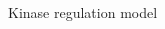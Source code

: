 \begin{frame}{Kinase regulation model}
\begin{columns}
\begin{column}{0.5\textwidth}


\end{column}


\end{columns}
\end{frame}
